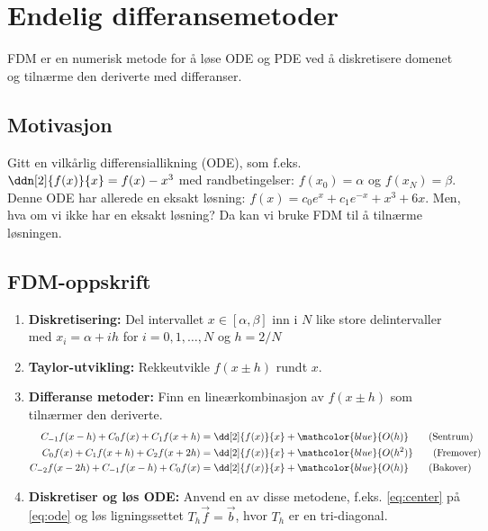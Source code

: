 \section{Endelig differansemetoder}

FDM er en numerisk metode for å løse ODE og PDE ved å diskretisere domenet og tilnærme den deriverte med differanser.

\subsection*{Motivasjon}

Gitt en vilkårlig differensiallikning (ODE), som f.eks. \( \ddn[2]{f(x)}{x} = f(x) - x^3 \)\label{eq:ode} med randbetingelser: \( f(x_0) = \alpha \) og \( f(x_N) = \beta \).
Denne ODE har allerede en eksakt løsning: \( f(x) = c_0e^x + c_1e^{-x} + x^3 + 6x \)\label{eq:exact}.
Men, hva om vi ikke har en eksakt løsning? Da kan vi bruke FDM til å tilnærme løsningen.

\subsection*{FDM-oppskrift}

\begin{enumerate}
    \item \textbf{Diskretisering:} Del intervallet \(x \in [\alpha, \beta]\) inn i \(N\) like store delintervaller med \(x_i = \alpha + ih\) for \(i = 0,1,\ldots,N\) og \(h = 2/N\)
    \item \textbf{Taylor-utvikling:} Rekkeutvikle \(f(x \pm h)\) rundt \(x\).
    \item \textbf{Differanse metoder:} Finn en lineærkombinasjon av \(f(x \pm h)\) som tilnærmer den deriverte.
          \begin{align}
              C_{-1}f(x - h) + C_0f(x) + C_1f(x + h)   & = \dd[2]{f(x)}{x} + \mathcolor{blue}{O(h)} \tag{Sentrum} \label{eq:center}     \\
              C_{0}f(x) + C_1f(x + h ) + C_2f(x + 2h)  & = \dd[2]{f(x)}{x} + \mathcolor{blue}{O(h^2)} \tag{Fremover} \label{eq:forward} \\
              C_{-2}f(x - 2h) + C_{-1}f(x-h) + C_0f(x) & = \dd[2]{f(x)}{x} + \mathcolor{blue}{O(h)} \tag{Bakover} \label{eq:backward}
          \end{align}
    \item \textbf{Diskretiser og løs ODE:} Anvend en av disse metodene, f.eks. \ref{eq:center} på \ref{eq:ode} og løs ligningssettet \(T_h \vec{f} = \vec{b}\), hvor \(T_h\) er en tri-diagonal.
\end{enumerate}

